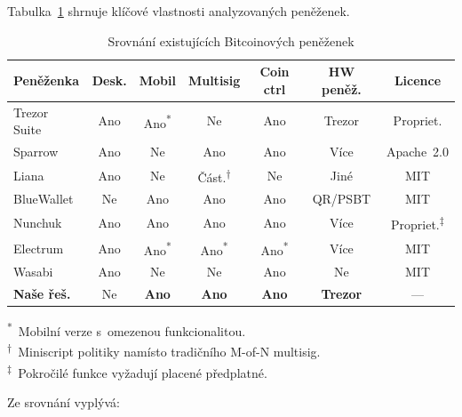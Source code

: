 Tabulka~\ref{tab:wallet-comparison} shrnuje klíčové vlastnosti analyzovaných
peněženek.

\begin{table}[htbp]
\centering
\caption{Srovnání existujících Bitcoinových peněženek}
\label{tab:wallet-comparison}
\footnotesize
\begin{tabular}{|l|c|c|c|c|c|c|}
\hline
\textbf{Peněženka} & \textbf{Desk.} & \textbf{Mobil} & \textbf{Multisig} & \textbf{Coin ctrl} & \textbf{HW peněž.} & \textbf{Licence} \\
\hline
Trezor Suite   & Ano & Ano\textsuperscript{*} & Ne  & Ano & Trezor    & Propriet. \\
Sparrow        & Ano & Ne                      & Ano & Ano & Více      & Apache~2.0 \\
Liana          & Ano & Ne                      & Část.\textsuperscript{$\dagger$} & Ne  & Jiné & MIT \\
BlueWallet     & Ne  & Ano                     & Ano & Ano & QR/PSBT   & MIT \\
Nunchuk        & Ano & Ano                     & Ano & Ano & Více      & Propriet.\textsuperscript{$\ddagger$} \\
Electrum       & Ano & Ano\textsuperscript{*}  & Ano\textsuperscript{*} & Ano\textsuperscript{*} & Více & MIT \\
Wasabi         & Ano & Ne                      & Ne  & Ano & Ne        & MIT \\
\hline
\textbf{Naše řeš.} & Ne & \textbf{Ano} & \textbf{Ano} & \textbf{Ano} & \textbf{Trezor} & --- \\
\hline
\end{tabular}
\normalsize

\smallskip
\footnotesize
\textsuperscript{*}~Mobilní verze s~omezenou funkcionalitou. \\
\textsuperscript{$\dagger$}~Miniscript politiky namísto tradičního M-of-N multisig. \\
\textsuperscript{$\ddagger$}~Pokročilé funkce vyžadují placené předplatné. \\
\normalsize
\end{table}

Ze srovnání vyplývá:

